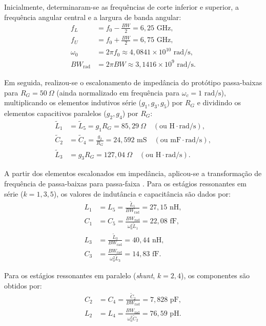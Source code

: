 Inicialmente, determinaram-se as frequências de corte inferior e superior, a frequência angular central e a largura de banda angular:
\begin{align}
    f_L &= f_0 - \frac{BW}{2} = 6{,}25\text{ GHz}, \\
    f_U &= f_0 + \frac{BW}{2} = 6{,}75\text{ GHz}, \\
    \omega_0 &= 2\pi f_0 \approx 4{,}0841 \times 10^{10}\text{ rad/s}, \\
    BW_{\text{rad}} &= 2\pi BW \approx 3{,}1416 \times 10^{9}\text{ rad/s}.
\end{align}

Em seguida, realizou-se o escalonamento de impedância do protótipo passa-baixas para $R_G = 50~\Omega$ (ainda normalizado em frequência para $\omega_c = 1\text{ rad/s}$), multiplicando os elementos indutivos série ($g_1, g_3, g_5$) por $R_G$ e dividindo os elementos capacitivos paralelos ($g_2, g_4$) por $R_G$:
\begin{align}
    \tilde{L}_1 &= \tilde{L}_5 = g_1 R_G = 85{,}29~\Omega \quad (\text{ou }\text{H}\cdot\text{rad/s}), \\
    \tilde{C}_2 &= \tilde{C}_4 = \frac{g_2}{R_G} = 24{,}592\text{ mS} \quad (\text{ou }\text{mF}\cdot\text{rad/s}), \\
    \tilde{L}_3 &= g_3 R_G = 127{,}04~\Omega \quad (\text{ou }\text{H}\cdot\text{rad/s}).
\end{align}

A partir dos elementos escalonados em impedância, aplicou-se a transformação de frequência de passa-baixas para passa-faixa \cite{ludwig2000rf}. Para os estágios ressonantes em série ($k = 1, 3, 5$), os valores de indutância e capacitância são dados por:
\begin{align}
    L_1 &= L_5 = \frac{\tilde{L}_1}{BW_{\text{rad}}} = 27{,}15\text{ nH}, \\
    C_1 &= C_5 = \frac{BW_{\text{rad}}}{\omega_0^2 \tilde{L}_1} = 22{,}08\text{ fF}, \\
    L_3 &= \frac{\tilde{L}_3}{BW_{\text{rad}}} = 40{,}44\text{ nH}, \\
    C_3 &= \frac{BW_{\text{rad}}}{\omega_0^2 \tilde{L}_3} = 14{,}83\text{ fF}.
\end{align}

Para os estágios ressonantes em paralelo (\textit{shunt}, $k = 2, 4$), os componentes são obtidos por:
\begin{align}
    C_2 &= C_4 = \frac{\tilde{C}_2}{BW_{\text{rad}}} = 7{,}828\text{ pF}, \\
    L_2 &= L_4 = \frac{BW_{\text{rad}}}{\omega_0^2 \tilde{C}_2} = 76{,}59\text{ pH}.
\end{align}

